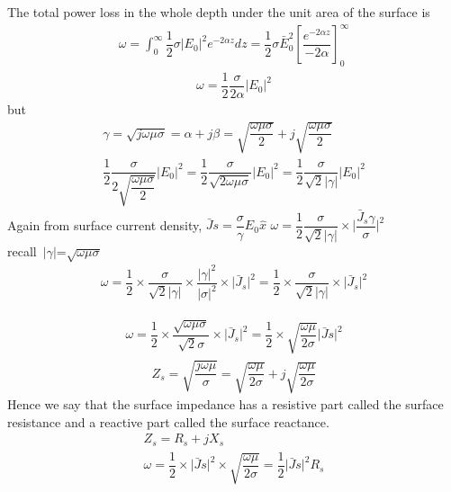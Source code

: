 The total power loss in the whole depth under the unit area of the surface is
\begin{align}
\omega=\int_{0}^{\infty}\dfrac{1}{2}\sigma\lvert E_{0}\rvert^{2}e^{-2\alpha z}dz=\dfrac{1}{2}\sigma\bar{E}_{0}^{2}[\dfrac{e^{-2\alpha z}}{-2\alpha}]_{0}^{\infty}
\end{align}
\begin{align}
\omega=\dfrac{1}{2}\dfrac{\sigma}{2\alpha}\lvert E_{0}\rvert^{2}
\end{align}
but
\begin{align}
\gamma=\sqrt{j\omega\mu\sigma}=\alpha+j\beta=\sqrt{\dfrac{\omega\mu\sigma}{2}}+j\sqrt{\dfrac{\omega\mu\sigma}{2}}\\
\dfrac{1}{2}\dfrac{\sigma}{2\sqrt{\dfrac{\omega\mu\sigma}{2}}}\lvert E_{0}\rvert^{2}=\dfrac{1}{2}\dfrac{\sigma}{\sqrt{2\omega\mu\sigma}}\lvert E_{0}\rvert^{2}=\dfrac{1}{2}\dfrac{\sigma}{\sqrt{2}\lvert\gamma\rvert}\lvert E_{0}\rvert^{2}
\end{align}
Again from surface current density,
$\bar{J}s=\dfrac{\sigma}{\gamma}E_{0}\hat{x}$
$\omega=\dfrac{1}{2}\dfrac{\sigma}{\sqrt{2}\lvert\gamma\rvert}\times \lvert\dfrac{\bar{J}_{s}\gamma}{\sigma}\rvert^{2}$\\
recall\ $\lvert$$\gamma$$\rvert$=$\sqrt{\omega\mu\sigma}$
\begin{align}
\omega=\dfrac{1}{2}\times \dfrac{\sigma}{\sqrt{2}\lvert\gamma\rvert}\times \dfrac{\lvert\gamma\rvert^{2}}{\lvert\sigma\rvert^{2}}\times \lvert\bar{J}_{s}\rvert^{2}=\dfrac{1}{2}\times \dfrac{\sigma}{\sqrt{2}\lvert\gamma\rvert}\times \lvert\bar{J}_{s}\rvert^{2}
\end{align}

\begin{align}
\omega=\dfrac{1}{2}\times \dfrac{\sqrt{\omega\mu\sigma}}{\sqrt{2}\sigma}\times \lvert\bar{J}_{s}\rvert^{2}=\dfrac{1}{2}\times \sqrt{\dfrac{\omega\mu}{2\sigma}}\lvert\bar{J}s\rvert^{2}
\end{align}
\begin{align}
Z_{s}=\sqrt{\dfrac{j\omega\mu}{\sigma}}=\sqrt{\dfrac{\omega\mu}{2\sigma}}+j\sqrt{\dfrac{\omega\mu}{2\sigma}}
\end{align}
Hence we say that the surface impedance has a resistive part called the surface resistance and a reactive part called the surface reactance.
\begin{align}
Z_{s}=R_{s}+jX_{s}\\	
\omega=\dfrac{1}{2}\times \lvert\bar{J}s\rvert^{2}\times \sqrt{\dfrac{\omega\mu}{2\sigma}}=\dfrac{1}{2}\lvert\bar{J}s\rvert^{2}R_{s}
\end{align}

